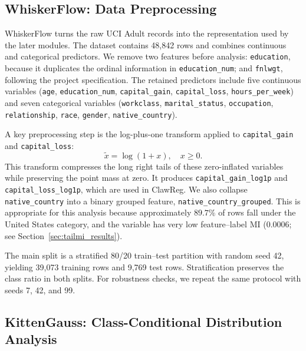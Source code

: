 \documentclass[11pt]{article}
\begin{document}
\subsection{WhiskerFlow: Data Preprocessing}
\label{sec:whiskerflow}

WhiskerFlow turns the raw UCI Adult records into the representation used by the later modules. The dataset contains 48{,}842 rows and combines continuous and categorical predictors. We remove two features before analysis: \texttt{education}, because it duplicates the ordinal information in \texttt{education\_num}; and \texttt{fnlwgt}, following the project specification. The retained predictors include five continuous variables (\texttt{age}, \texttt{education\_num}, \texttt{capital\_gain}, \texttt{capital\_loss}, \texttt{hours\_per\_week}) and seven categorical variables (\texttt{workclass}, \texttt{marital\_status}, \texttt{occupation}, \texttt{relationship}, \texttt{race}, \texttt{gender}, \texttt{native\_country}).

A key preprocessing step is the log-plus-one transform applied to \texttt{capital\_gain} and \texttt{capital\_loss}:
\begin{equation}
  \tilde{x} = \log(1 + x), \quad x \geq 0.
  \label{eq:log1p}
\end{equation}
This transform compresses the long right tails of these zero-inflated variables while preserving the point mass at zero. It produces \texttt{capital\_gain\_log1p} and \texttt{capital\_loss\_log1p}, which are used in ClawReg. We also collapse \texttt{native\_country} into a binary grouped feature, \texttt{native\_country\_grouped}. This is appropriate for this analysis because approximately $89.7\%$ of rows fall under the United States category, and the variable has very low feature--label MI ($0.0006$; see Section~\ref{sec:tailmi_results}).

The main split is a stratified 80/20 train--test partition with random seed 42, yielding 39{,}073 training rows and 9{,}769 test rows. Stratification preserves the class ratio in both splits. For robustness checks, we repeat the same protocol with seeds 7, 42, and 99.

\subsection{KittenGauss: Class-Conditional Distribution Analysis}
\label{sec:kittengauss}
\end{document}
